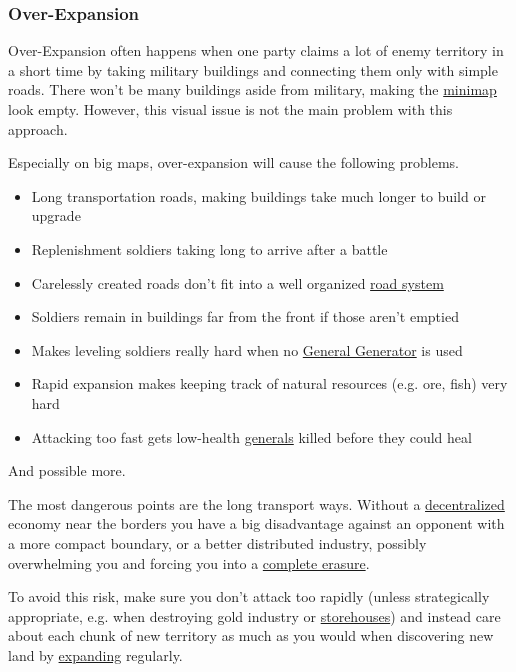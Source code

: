 \documentclass[12pt]{article}
\begin{document}
\subsubsection{Over-Expansion}
\label{sec:overexpansion}

Over-Expansion often happens when one party claims a lot of enemy territory in a short time by taking military buildings and connecting them only with simple roads. There won't be many buildings aside from military, making the \hyperref[sec:minimap]{minimap} look empty. However, this visual issue is not the main problem with this approach.

Especially on big maps, over-expansion will cause the following problems.

\begin{itemize}
    \item Long transportation roads, making buildings take much longer to build or upgrade
    \item Replenishment soldiers taking long to arrive after a battle
    \item Carelessly created roads don't fit into a well organized \hyperref[sec:roadsystem]{road system}
    \item Soldiers remain in buildings far from the front if those aren't emptied
    \item Makes leveling soldiers really hard when no \hyperref[sec:generalgenerator]{General Generator} is used
    \item Rapid expansion makes keeping track of natural resources (e.g. ore, fish) very hard
    \item Attacking too fast gets low-health \hyperref[sec:general]{generals} killed before they could heal
\end{itemize}

And possible more.

The most dangerous points are the long transport ways. Without a \hyperref[sec:decentralization]{decentralized} economy near the borders you have a big disadvantage against an opponent with a more compact boundary, or a better distributed industry, possibly overwhelming you and forcing you into a \hyperref[sec:completeerasure]{complete erasure}.

To avoid this risk, make sure you don't attack too rapidly (unless strategically appropriate, e.g. when destroying gold industry or \hyperref[sec:storehouse]{storehouses}) and instead care about each chunk of new territory as much as you would when discovering new land by \hyperref[sec:expanding]{expanding} regularly.
\end{document}
